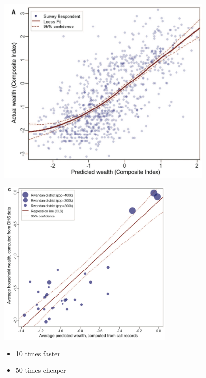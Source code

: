 \documentclass{beamer}
\def\vf{\vfill}
\begin{document}
\begin{frame}

\begin{center}
\includegraphics[width=0.8\textwidth]{figures/blumenstock_predicting_2015_fig1a}
\end{center}

\vf
{}

\end{frame}
\begin{frame}

\begin{center}
\includegraphics[width=0.65\textwidth]{figures/blumenstock_predicting_2015_fig3c}
\end{center}

\pause

\begin{itemize}
\item 10 times faster
\item 50 times cheaper
\end{itemize}

\vf
{}
\end{frame}
\end{document}

